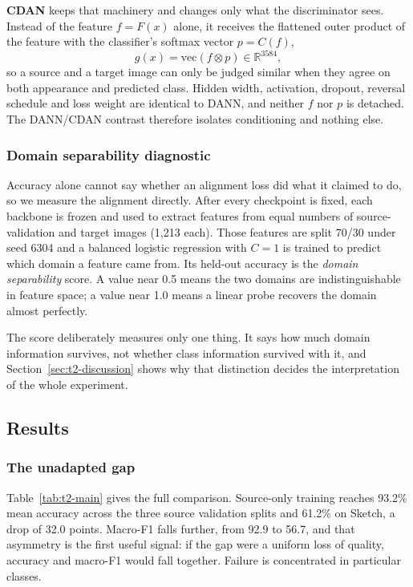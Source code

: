 \textbf{CDAN} keeps that machinery and changes only what the discriminator sees.
Instead of the feature $f = F(x)$ alone, it receives the flattened outer product
of the feature with the classifier's softmax vector $p = C(f)$,
\begin{equation}
g(x) = \mathrm{vec}(f \otimes p) \in \mathbb{R}^{3584},
\end{equation}
so a source and a target image can only be judged similar when they agree on both
appearance and predicted class. Hidden width, activation, dropout, reversal
schedule and loss weight are identical to DANN, and neither $f$ nor $p$ is
detached. The DANN/CDAN contrast therefore isolates conditioning and nothing else.

\subsubsection{Domain separability diagnostic}
\label{sec:t2-diagnostic}

Accuracy alone cannot say whether an alignment loss did what it claimed to do, so
we measure the alignment directly. After every checkpoint is fixed, each backbone
is frozen and used to extract features from equal numbers of source-validation
and target images (1{,}213 each). Those features are split 70/30 under seed 6304
and a balanced logistic regression with $C=1$ is trained to predict which domain
a feature came from. Its held-out accuracy is the \emph{domain separability}
score. A value near 0.5 means the two domains are indistinguishable in feature
space; a value near 1.0 means a linear probe recovers the domain almost perfectly.

The score deliberately measures only one thing. It says how much domain
information survives, not whether class information survived with it, and
Section~\ref{sec:t2-discussion} shows why that distinction decides the
interpretation of the whole experiment.

\subsection{Results}

\subsubsection{The unadapted gap}

Table~\ref{tab:t2-main} gives the full comparison. Source-only training reaches
93.2\% mean accuracy across the three source validation splits and 61.2\% on
Sketch, a drop of 32.0 points. Macro-F1 falls further, from 92.9 to 56.7, and
that asymmetry is the first useful signal: if the gap were a uniform loss of
quality, accuracy and macro-F1 would fall together. Failure is concentrated in
particular classes.

